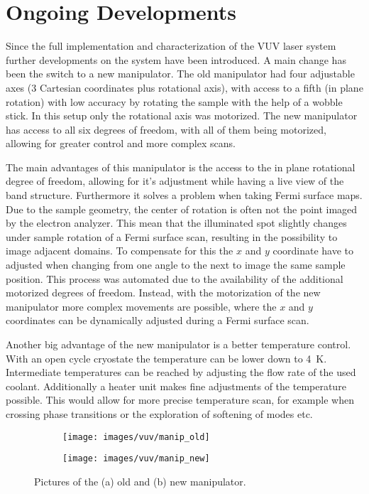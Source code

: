 

\section{Ongoing Developments}

Since the full implementation and characterization of the VUV laser system further developments on the system have been introduced.
A main change has been the switch to a new manipulator.
The old manipulator had four adjustable axes (3 Cartesian coordinates plus rotational axis), with access to a fifth (in plane rotation) with low accuracy by rotating the sample with the help of a wobble stick.
In this setup only the rotational axis was motorized.
The new manipulator has access to all six degrees of freedom, with all of them being motorized, allowing for greater control and more complex scans.

The main advantages of this manipulator is the access to the in plane rotational degree of freedom, allowing for it's adjustment while having a live view of the band structure.
Furthermore it solves a problem when taking Fermi surface maps.
Due to the sample geometry, the center of rotation is often not the point imaged by the electron analyzer.
This mean that the illuminated spot slightly changes under sample rotation of a Fermi surface scan, resulting in the possibility to image adjacent domains.
To compensate for this the $x$ and $y$ coordinate have to adjusted when changing from one angle to the next to image the same sample position.
This process was automated due to the availability of the additional motorized degrees of freedom.
Instead, with the motorization of the new manipulator more complex movements are possible, where the $x$ and $y$ coordinates can be dynamically adjusted during a Fermi surface scan.

Another big advantage of the new manipulator is a better temperature control.
With an open cycle cryostate the temperature can be lower down to \qty{4}{\kelvin}.
Intermediate temperatures can be reached by adjusting the flow rate of the used coolant.
Additionally a heater unit makes fine adjustments of the temperature possible.
This would allow for more precise temperature scan, for example when crossing phase transitions or the exploration of softening of modes etc.

\begin{figure}[h]
	\centering
	\begin{subfigure}[b]{0.46\textwidth}
		\texttt{[image: images/vuv/manip\_old]}
		\caption{}
	\end{subfigure}
	\begin{subfigure}[b]{0.46\textwidth}
		\texttt{[image: images/vuv/manip\_new]}
		\caption{}
	\end{subfigure}
	\caption{Pictures of the (a) old and (b) new manipulator.}
	\label{fig:manip_full}
\end{figure}

